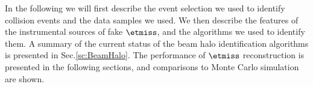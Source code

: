 In the following we will first describe the event selection we used to
identify collision events and the data samples we used. We then describe
the features of the instrumental sources of fake $\etmiss$, and the
algorithms we used to identify them. A summary of the current status of
the beam halo identification algorithms is presented in
Sec.\ref{sc:BeamHalo}. The performance of $\etmiss$ reconstruction is
presented in the following sections, and comparisons to Monte Carlo
simulation are shown. 

